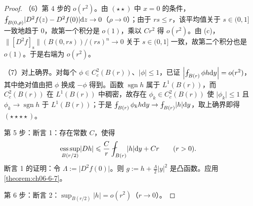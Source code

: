 \documentclass[../../main.tex]{subfiles}%
\begin{document}
\begin{proof}
（6）第 4 步的 $o(r^{2})$。由 $(\star\star)$ 中 $x=0$ 的条件，$\fint_{B(0,\rho)}\lvert D^{2}f(z)-D^{2}f(0)\rvert\diff z\to0$（$\rho\to0$）；由于 $rs\leqslant r$，该平均值关于 $s\in(0,1]$ 一致地趋于 $0$，故第一个积分是 $o(1)$，乘以 $Cr^{2}$ 得 $o(r^{2})$。由 (c)，$\lVert[D^{2}f]_{\mathrm{s}}\rVert(B(0,rs))/(rs)^{n}\to0$ 关于 $s\in(0,1]$ 一致，故第二个积分也是 $o(1)$。于是右端为 $o(r^{2})$。

（7）对上确界。对每个 $\phi\in C_{c}^{2}(B(r))$、$\lvert\phi\rvert\leqslant1$，已证 $\left|\fint_{B(r)}\phi h\diff y\right|=o(r^{2})$，其中绝对值由把 $\phi$ 换成 $-\phi$ 得到。函数 $\operatorname{sgn}h$ 属于 $L^{1}(B(r))$，而 $C_{c}^{2}(B(r))$ 在 $L^{1}(B(r))$ 中稠密，故存在 $\phi_{k}\in C_{c}^{2}(B(r))$ 使 $\lvert\phi_{k}\rvert\leqslant1$ 且 $\phi_{k}\to\operatorname{sgn}h$ 于 $L^{1}(B(r))$；于是 $\fint_{B(r)}\phi_{k}h\diff y\to\fint_{B(r)}\lvert h\rvert\diff y$，取上确界即得 $(\star\star\star\star)$。


第 5 步：断言 1：存在常数 $C$，使得
\begin{align*}
\operatorname*{ess\,sup}_{B(r/2)}\lvert Dh\rvert\leqslant\frac{C}{r}\fint_{B(r)}\lvert h\rvert\diff y+Cr\qquad(r>0).
\end{align*}
断言 1 的证明：令 $\Lambda:=\lvert D^{2}f(0)\rvert$。则 $g:=h+\frac{\Lambda}{2}\lvert y\rvert^{2}$ 是凸函数。应用\cref{theorem:ch06-6-7}。%

第 6 步：断言 2：$\sup_{B(r/2)}\lvert h\rvert=o(r^{2})$（$r\to0$）。


\end{proof}
\end{document}
